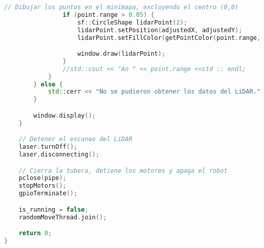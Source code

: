 \begin{lstlisting}[language={C++}, caption={Primer ajuste de c\'odigo}, label={Script}]
                // Dibujar los puntos en el minimapa, excluyendo el centro (0,0)
                if (point.range > 0.05) {
                    sf::CircleShape lidarPoint(2);
                    lidarPoint.setPosition(adjustedX, adjustedY);
                    lidarPoint.setFillColor(getPointColor(point.range, max_range));

                    window.draw(lidarPoint);
                }
                //std::cout << "An " << point.range <<std :: endl;
            }
        } else {
            std::cerr << "No se pudieron obtener los datos del LiDAR." << std::endl;
        }

        window.display();
    }

    // Detener el escaneo del LiDAR
    laser.turnOff();
    laser.disconnecting();

    // Cierra la tubera, detiene los motores y apaga el robot
    pclose(pipe);
    stopMotors();
    gpioTerminate();

    is_running = false;
    randomMoveThread.join();

    return 0;
}
    \end{lstlisting}